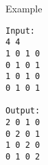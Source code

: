 Example
\begin{verbatim}
Input:
4 4
1 0 1 0
0 1 0 1
1 0 1 0
0 1 0 1

Output:
2 0 1 0
0 2 0 1
1 0 2 0
0 1 0 2

\end{verbatim}